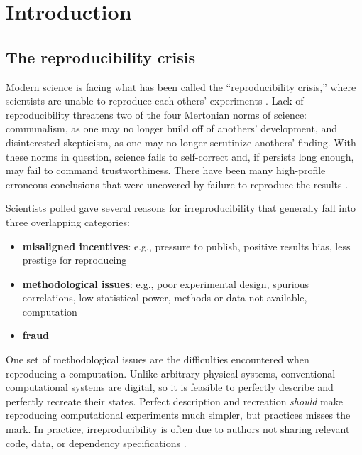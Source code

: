 \section{Introduction}

\subsection{The reproducibility crisis}

Modern science is facing what has been called the ``reproducibility crisis,'' where scientists are unable to reproduce each others' experiments \cite{natureRepro,manifesto4ReproducibleScience}.
Lack of reproducibility threatens two of the four Mertonian norms \cite{sociologyOfScience} of science: communalism, as one may no longer build off of anothers' development, and disinterested skepticism, as one may no longer scrutinize anothers' finding.
With these norms in question, science fails to self-correct and, if persists long enough, may fail to command trustworthiness.
There have been many high-profile erroneous conclusions that were uncovered by failure to reproduce the results \cite{herndonCritiqueReinhartRogoff,scientistNightmareSoftware,fMRIClusterFailure,neupaneRetraction}.

Scientists polled gave several reasons for irreproducibility \cite{natureRepro} that generally fall into three overlapping categories:
\begin{itemize}
  \item \textbf{misaligned incentives}: e.g., pressure to publish, positive results bias, less prestige for reproducing
  \item \textbf{methodological issues}: e.g., poor experimental design, spurious correlations, low statistical power, methods or data not available, computation
  \item \textbf{fraud}
\end{itemize}

One set of methodological issues are the difficulties encountered when reproducing a computation.
Unlike arbitrary physical systems, conventional computational systems are digital, so it is feasible to perfectly describe and perfectly recreate their states.
Perfect description and recreation \textit{should} make reproducing computational experiments much simpler, but practices misses the mark.
In practice, irreproducibility is often due to authors not sharing relevant code, data, or dependency specifications \cite{reproducibleSignalProc,whyWorkflowsBreak,collbergTechRep}.

